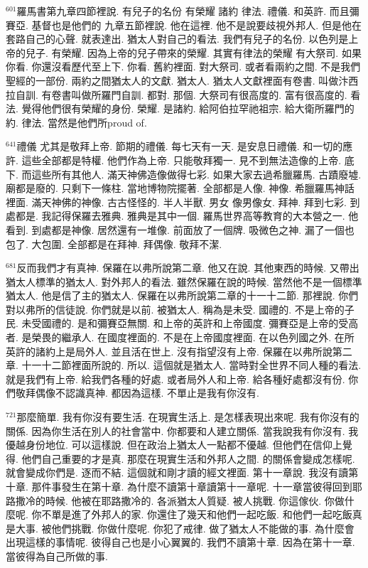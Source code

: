 \documentclass{book}
\begin{document}
$^{601}$羅馬書第九章四節裡說.
有兒子的名份 有榮耀 諸約 律法.
禮儀.
和英許.
而且彌賽亞.
基督也是他們的 九章五節裡說.
他在這裡.
他不是說要歧視外邦人.
但是他在套路自己的心聲.
就表達出.
猶太人對自己的看法.
我們有兒子的名份.
以色列是上帝的兒子.
有榮耀.
因為上帝的兒子帶來的榮耀.
其實有律法的榮耀 有大祭司.
如果你看.
你還沒看歷代至上下.
你看.
舊約裡面.
對大祭司.
或者看兩約之間.
不是我們聖經的一部份.
兩約之間猶太人的文獻.
猶太人.
猶太人文獻裡面有卷書.
叫做汴西拉自訓.
有卷書叫做所羅門自訓.
都對.
那個.
大祭司有很高度的.
富有很高度的.
看法.
覺得他們很有榮耀的身份.
榮耀.
是諸約.
給阿伯拉罕祂祖宗.
給大衛所羅門的約.
律法.
當然是他們所proud of.

$^{641}$禮儀 尤其是敬拜上帝.
節期的禮儀.
每七天有一天.
是安息日禮儀.
和一切的應許.
這些全部都是特權.
他們作為上帝.
只能敬拜獨一.
見不到無法造像的上帝.
底下.
而這些所有其他人.
滿天神佛造像做得七彩.
如果大家去過希臘羅馬.
古蹟廢墟.
廟都是廢的.
只剩下一條柱.
當地博物院擺著.
全部都是人像.
神像.
希臘羅馬神話裡面.
滿天神佛的神像.
古古怪怪的.
半人半獸.
男女 像男像女.
拜神.
拜到七彩.
到處都是.
我記得保羅去雅典.
雅典是其中一個.
羅馬世界高等教育的大本營之一.
他看到.
到處都是神像.
居然還有一堆像.
前面放了一個牌.
吸微色之神.
漏了一個也包了.
大包圍.
全部都是在拜神.
拜偶像.
敬拜不潔.

$^{681}$反而我們才有真神.
保羅在以弗所說第二章.
他又在說.
其他東西的時候.
又帶出猶太人標準的猶太人.
對外邦人的看法.
雖然保羅在說的時候.
當然他不是一個標準猶太人.
他是信了主的猶太人.
保羅在以弗所說第二章的十一十二節.
那裡說.
你們對以弗所的信徒說.
你們就是以前.
被猶太人.
稱為是未受.
國禮的.
不是上帝的子民.
未受國禮的.
是和彌賽亞無關.
和上帝的英許和上帝國度.
彌賽亞是上帝的受高者.
是榮畏的繼承人.
在國度裡面的.
不是在上帝國度裡面.
在以色列國之外.
在所英許的諸約上是局外人.
並且活在世上.
沒有指望沒有上帝.
保羅在以弗所說第二章.
十一十二節裡面所說的.
所以.
這個就是猶太人.
當時對全世界不同人種的看法.
就是我們有上帝.
給我們各種的好處.
或者局外人和上帝.
給各種好處都沒有份.
你們敬拜偶像不認識真神.
都因為這樣.
不單止是我有你沒有.

$^{721}$那麼簡單.
我有你沒有要生活.
在現實生活上.
是怎樣表現出來呢.
我有你沒有的關係.
因為你生活在別人的社會當中.
你都要和人建立關係.
當我說我有你沒有.
我優越身份地位.
可以這樣說.
但在政治上猶太人一點都不優越.
但他們在信仰上覺得.
他們自己重要的才是真.
那麼在現實生活和外邦人之間.
的關係會變成怎樣呢.
就會變成你們是.
逐而不結.
這個就和剛才讀的經文裡面.
第十一章說.
我沒有讀第十章.
那件事發生在第十章.
為什麼不讀第十章讀第十一章呢.
十一章當彼得回到耶路撒冷的時候.
他被在耶路撒冷的.
各派猶太人質疑.
被人挑戰.
你這傢伙.
你做什麼呢.
你不單是進了外邦人的家.
你還住了幾天和他們一起吃飯.
和他們一起吃飯真是大事.
被他們挑戰.
你做什麼呢.
你犯了戒律.
做了猶太人不能做的事.
為什麼會出現這樣的事情呢.
彼得自己也是小心翼翼的.
我們不讀第十章.
因為在第十一章.
當彼得為自己所做的事.
\end{document}

